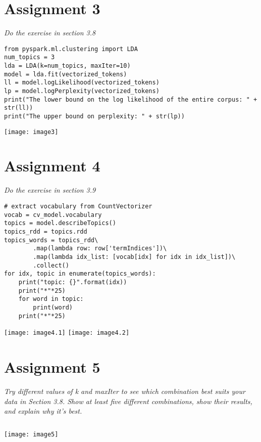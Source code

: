 \documentclass[]{article}
\begin{document}
\section*{Assignment 3}
\emph{ Do the exercise in section 3.8 }

\begin{verbatim}
from pyspark.ml.clustering import LDA
num_topics = 3
lda = LDA(k=num_topics, maxIter=10)
model = lda.fit(vectorized_tokens)
ll = model.logLikelihood(vectorized_tokens)
lp = model.logPerplexity(vectorized_tokens)
print("The lower bound on the log likelihood of the entire corpus: " +  str(ll))
print("The upper bound on perplexity: " + str(lp))
\end{verbatim}
\texttt{[image: image3]} 


\section*{Assignment 4}
\emph{ Do the exercise in section 3.9 }

\begin{verbatim}
# extract vocabulary from CountVectorizer
vocab = cv_model.vocabulary
topics = model.describeTopics() 
topics_rdd = topics.rdd
topics_words = topics_rdd\
		.map(lambda row: row['termIndices'])\
		.map(lambda idx_list: [vocab[idx] for idx in idx_list])\
		.collect()
for idx, topic in enumerate(topics_words):
	print("topic: {}".format(idx))
	print("*"*25)
	for word in topic:
		print(word)
	print("*"*25)
\end{verbatim}
\texttt{[image: image4.1]} %
\texttt{[image: image4.2]} %


\section*{Assignment 5}
\emph{ Try different values of k and maxIter to see which combination best suits your data in Section 3.8. Show at least five different combinations, show their results, and explain why it’s best.
}

\begin{verbatim}

\end{verbatim}
\texttt{[image: image5]} %
\end{document}
